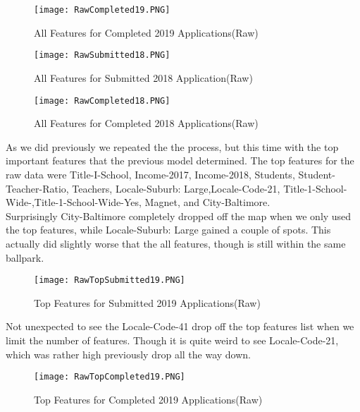 \documentclass[12pt]{article}
\begin{document}
\begin{figure}[!htb]
  \centering
  \texttt{[image: RawCompleted19.PNG]}
  \caption{All Features for Completed 2019 Applications(Raw)}
  \label{fig:feature_importance}
\end{figure}

\begin{figure}[!htb]
  \centering
  \texttt{[image: RawSubmitted18.PNG]}
  \caption{All Features for Submitted 2018 Application(Raw)}
  \label{fig:feature_importance}
\end{figure}

\begin{figure}[!htb]
  \centering
  \texttt{[image: RawCompleted18.PNG]}
  \caption{All Features for Completed 2018 Applications(Raw)}
  \label{fig:feature_importance}
\end{figure}


As we did previously we repeated the the process, but this time with the top important features that the previous model determined. The top features for the raw data were Title-I-School, Income-2017, Income-2018, Students, Student-Teacher-Ratio, Teachers, Locale-Suburb: Large,Locale-Code-21, Title-1-School-Wide-,Title-1-School-Wide-Yes, Magnet, and City-Baltimore.\\

Surprisingly City-Baltimore completely dropped off the map when we only used the top features, while Locale-Suburb: Large gained a couple of spots. This actually did slightly worse that the all features, though is still within the same ballpark.

\begin{figure}[!htb]
  \centering
  \texttt{[image: RawTopSubmitted19.PNG]}
  \caption{Top Features for Submitted 2019 Applications(Raw)}
  \label{fig:feature_importance}
\end{figure}

Not unexpected to see the Locale-Code-41 drop off the top features list when we limit the number of features. Though it is quite weird to see Locale-Code-21, which was rather high previously drop all the way down.

\begin{figure}[!htb]
  \centering
  \texttt{[image: RawTopCompleted19.PNG]}
  \caption{Top Features for Completed 2019 Applications(Raw)}
  \label{fig:feature_importance}
\end{figure}
\end{document}
